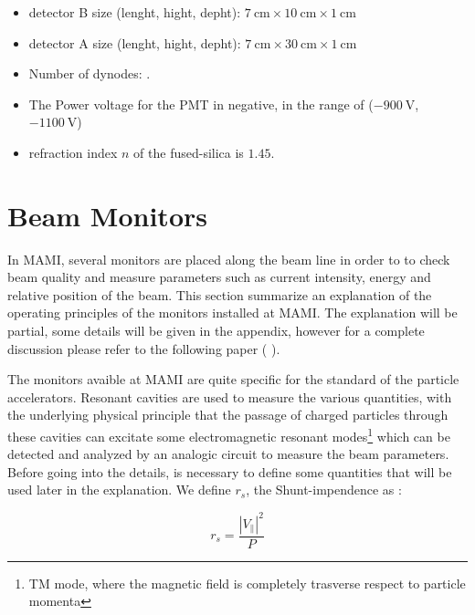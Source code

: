 \begin{itemize}
\item detector B size (lenght, hight, depht): $\SI{7}{\centi \meter} \times \SI{10}{\centi \meter} \times \SI{1}{\centi \meter}$
\item detector A size (lenght, hight, depht): $\SI{7}{\centi \meter} \times \SI{30}{\centi \meter} \times \SI{1}{\centi \meter}$
\item Number of dynodes: .
\item The Power voltage for the PMT in negative, in the range of ($\SI{-900}{\volt}$, $\SI{-1100}{\volt}$)
\item refraction index $n$ of the fused-silica is $1.45$.
\end{itemize}


\section{Beam Monitors}

In MAMI, several monitors are placed along the beam line in order to to check beam quality and measure parameters such as current intensity, energy and relative position of the beam. This section summarize an explanation of the operating principles of the monitors installed at MAMI. The explanation will be partial, some details will be given in the appendix, however for a complete discussion please refer to the following paper ( \cite{M_Dehn}).

The monitors avaible at MAMI are quite specific for the standard of the particle accelerators. Resonant cavities are used to measure the various quantities, with the underlying physical principle that the passage of charged particles through these cavities can excitate some electromagnetic resonant modes\footnote{TM mode, where the magnetic field is completely trasverse respect to particle momenta} which can be detected and analyzed by an analogic circuit to measure the beam parameters.
Before going into the details, is necessary to define some quantities that will be used later in the explanation. We define $r_{s}$, the Shunt-impendence as :

\begin{equation}
r_{s} = \frac{|V_{\|}|^{2}}{P}
\end{equation}

